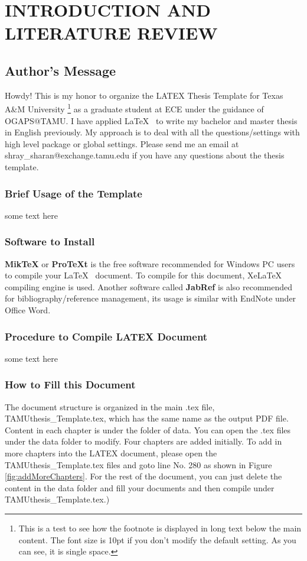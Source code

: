 \chapter[INTRODUCTION AND LITERATURE REVIEW]{INTRODUCTION AND \\  LITERATURE REVIEW}

\section{Author's Message}

Howdy! This is my honor to organize the LATEX Thesis Template for Texas A\&M
University
\footnote{This is a test to see how the footnote is displayed in long text below the main content. The font size is 10pt if you don't modify the default setting. As you can see, it is single space.} 
as a graduate student at ECE under the guidance of OGAPS@TAMU. I have
 applied \LaTeX ~ to write my bachelor and master thesis in English previously. My approach is to deal with all the questions/settings with high level package or
global settings. Please send me an email at shray\_sharan@exchange.tamu.edu if you have any questions about the thesis template.



\subsection{Brief Usage of the Template}

some text here


\subsection*{Software to Install}

\textbf{MikTeX} or \textbf{ProTeXt} is the free software recommended for Windows PC users to
compile your \LaTeX ~ document. To compile for this document, XeLaTeX compiling engine
is used. Another software called \textbf{JabRef} is also recommended for bibliography/reference
management, its usage is similar with EndNote under Office Word.

\subsection*{Procedure to Compile LATEX Document}


some text here


\subsection{How to Fill this Document}
The document structure is organized in the main .tex file, TAMUthesis\_Template.tex,
which has the same name as the output PDF file. Content in each chapter is under the
folder of data. You can open the .tex files under the data folder to modify. Four chapters
are added initially. To add in more chapters into the LATEX document, please open the
TAMUthesis\_Template.tex files and goto line No. 280 as shown in Figure \ref{fig:addMoreChapters}.
For the rest of the document, you can just delete the content in the data folder and
fill your documents and then compile under TAMUthesis\_Template.tex.)


